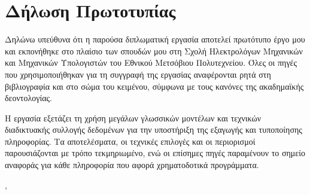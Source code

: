 \chapter*{Δήλωση Πρωτοτυπίας}

Δηλώνω υπεύθυνα ότι η παρούσα διπλωματική εργασία αποτελεί πρωτότυπο έργο
μου και εκπονήθηκε στο πλαίσιο των σπουδών μου στη Σχολή Ηλεκτρολόγων
Μηχανικών και Μηχανικών Υπολογιστών του Εθνικού Μετσόβιου Πολυτεχνείου.
Όλες οι πηγές που χρησιμοποιήθηκαν για τη συγγραφή της εργασίας αναφέρονται
ρητά στη βιβλιογραφία και στο σώμα του κειμένου, σύμφωνα με τους κανόνες της
ακαδημαϊκής δεοντολογίας.

Η εργασία εξετάζει τη χρήση μεγάλων γλωσσικών μοντέλων και τεχνικών
διαδικτυακής συλλογής δεδομένων για την υποστήριξη της εξαγωγής και
τυποποίησης πληροφορίας. Τα αποτελέσματα, οι τεχνικές επιλογές και οι
περιορισμοί παρουσιάζονται με τρόπο τεκμηριωμένο, ενώ οι επίσημες πηγές
παραμένουν το σημείο αναφοράς για κάθε πληροφορία που αφορά χρηματοδοτικά
προγράμματα.

\vspace{1.5cm}

\noindent\thesisauthor

\noindent\thesisplace, \thesisyear
\clearpage

